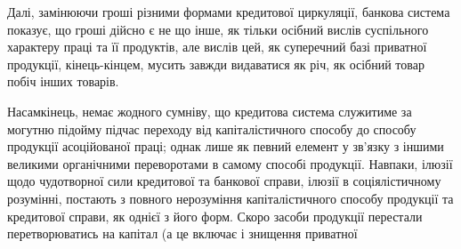 Далі, замінюючи гроші різними формами кредитової циркуляції, банкова
система показує, що гроші дійсно є не що інше, як тільки осібний вислів суспільного
характеру праці та її продуктів, але вислів цей, як суперечний базі приватної
продукції, кінець-кінцем, мусить завжди видаватися як річ, як осібний
товар побіч інших товарів.

Насамкінець, немає жодного сумніву, що кредитова система служитиме за
могутню підойму підчас переходу від капіталістичного способу до способу продукції
асоційованої праці; однак лише як певний елемент у зв’язку з іншими
великими органічними переворотами в самому способі продукції. Навпаки, ілюзії
щодо чудотворної сили кредитової та банкової справи, ілюзії в соціялістичному
розумінні, постають з повного нерозуміння капіталістичного способу продукції
та кредитової справи, як однієї з його форм. Скоро засоби продукції перестали
перетворюватись на капітал (а це включає і знищення приватної
\parbreak{}  %
